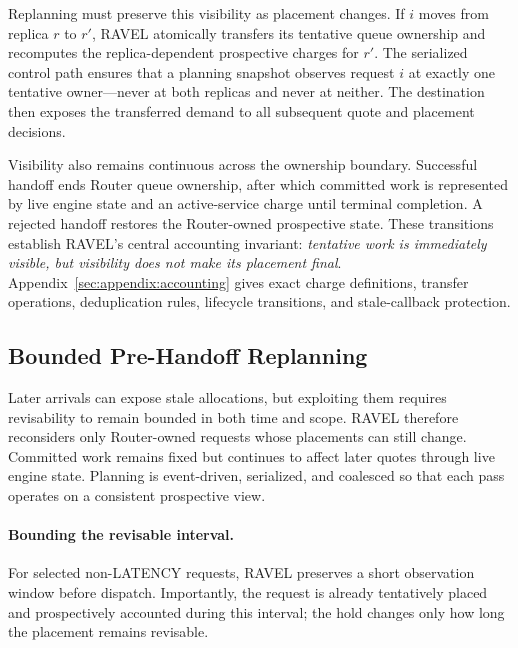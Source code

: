 Replanning must preserve this visibility as placement changes.
If $i$ moves from replica $r$ to $r'$, RAVEL atomically transfers its tentative
queue ownership and recomputes the replica-dependent prospective charges for
$r'$.
The serialized control path ensures that a planning snapshot observes
request $i$ at exactly one tentative owner---never at both replicas and never
at neither.
The destination then exposes the transferred demand to all subsequent quote
and placement decisions.

Visibility also remains continuous across the ownership boundary.
Successful handoff ends Router queue ownership, after which committed work is
represented by live engine state and an active-service charge until terminal
completion.
A rejected handoff restores the Router-owned prospective state.
These transitions establish RAVEL's central accounting invariant:
\emph{tentative work is immediately visible, but visibility does not make its
placement final}.
Appendix~\ref{sec:appendix:accounting} gives exact charge definitions, transfer
operations, deduplication rules, lifecycle transitions, and stale-callback
protection.


\subsection{Bounded Pre-Handoff Replanning}
\label{sec:design:replanning}

Later arrivals can expose stale allocations, but exploiting them requires
revisability to remain bounded in both time and scope.
RAVEL therefore reconsiders only Router-owned requests whose placements can
still change.
Committed work remains fixed but continues to affect later quotes through live
engine state.
Planning is event-driven, serialized, and coalesced so that each pass operates
on a consistent prospective view.

\paragraph{Bounding the revisable interval.}
For selected non-LATENCY requests, RAVEL preserves a short observation window
before dispatch.
Importantly, the request is already tentatively placed and prospectively
accounted during this interval; the hold changes only how long the placement
remains revisable.

